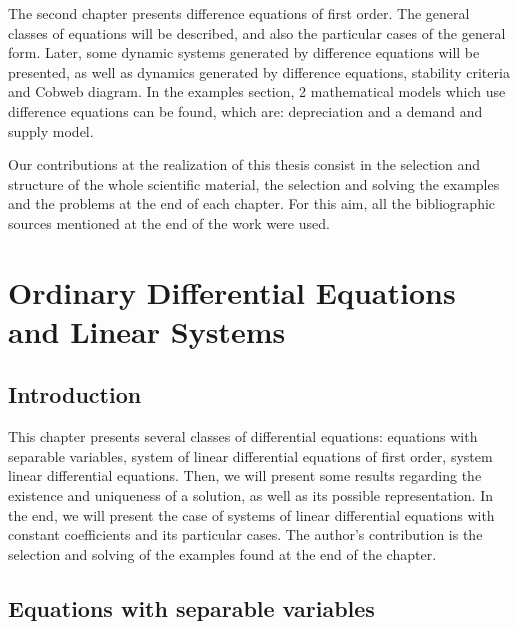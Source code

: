 \documentclass[a4paper,11pt]{report}
\begin{document}
The second chapter presents difference equations of first order. The general classes of equations will be described, and also the particular cases of the general form. Later, some dynamic systems generated by difference equations will be presented, as well as dynamics generated by difference equations, stability criteria and Cobweb diagram. In the examples section, 2 mathematical models which use difference equations can be found, which are: depreciation and a demand and supply model.\par
Our contributions at the realization of this thesis consist in the selection and structure of the whole scientific material, the selection and solving the examples and the problems at the end of each chapter. For this aim, all the bibliographic sources mentioned at the end of the work were used.

 


 \chapter{Ordinary Differential Equations and Linear Systems}
 \section{Introduction}
 This chapter presents several classes of differential equations: equations with separable variables, system of linear differential equations of first order, system linear differential equations. Then, we will present some results regarding the existence and uniqueness of a solution, as well as its possible representation. In the end, we will present the case of systems of linear differential equations with constant coefficients and its particular cases.
 The author's contribution is the selection and solving of the examples found at the end of the chapter.
 \section{Equations with separable variables}\label{1.1.1}
\end{document}
